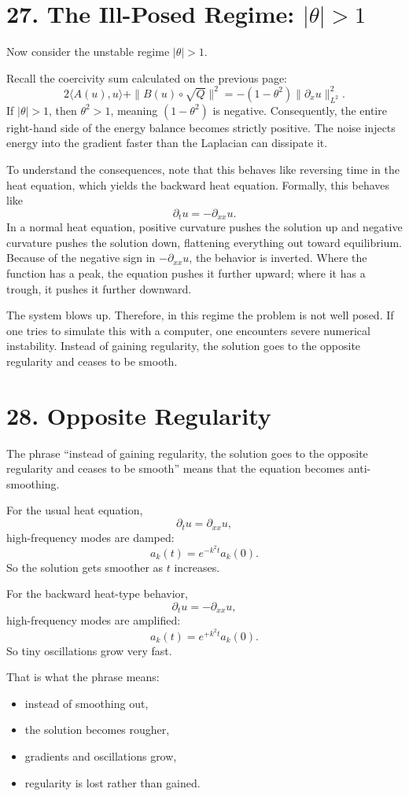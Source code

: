 \documentclass[11pt]{article}
\theoremstyle{definition}
\theoremstyle{remark}
\begin{document}
\section*{27. The Ill-Posed Regime: $|\theta|>1$}
Now consider the unstable regime $|\theta|>1$.

Recall the coercivity sum calculated on the previous page:
\[
2\langle A(u),u\rangle+\|B(u)\circ \sqrt{Q}\|^2=-(1-\theta^2)\|\partial_x u\|_{L^2}^2.
\]
If $|\theta|>1$, then $\theta^2>1$, meaning $(1-\theta^2)$ is negative. Consequently, the entire right-hand side of the energy balance becomes strictly positive. The noise injects energy into the gradient faster than the Laplacian can dissipate it.

To understand the consequences, note that this behaves like reversing time in the heat equation, which yields the backward heat equation. Formally, this behaves like
\[
\partial_t u=-\partial_{xx}u.
\]
In a normal heat equation, positive curvature pushes the solution up and negative curvature pushes the solution down, flattening everything out toward equilibrium. Because of the negative sign in $-\partial_{xx}u$, the behavior is inverted. Where the function has a peak, the equation pushes it further upward; where it has a trough, it pushes it further downward.

The system blows up. Therefore, in this regime the problem is not well posed. If one tries to simulate this with a computer, one encounters severe numerical instability. Instead of gaining regularity, the solution goes to the opposite regularity and ceases to be smooth.

\section*{28. Opposite Regularity}
The phrase ``instead of gaining regularity, the solution goes to the opposite regularity and ceases to be smooth'' means that the equation becomes anti-smoothing.

For the usual heat equation,
\[
\partial_t u=\partial_{xx}u,
\]
high-frequency modes are damped:
\[
a_k(t)=e^{-k^2 t}a_k(0).
\]
So the solution gets smoother as $t$ increases.

For the backward heat-type behavior,
\[
\partial_t u=-\partial_{xx}u,
\]
high-frequency modes are amplified:
\[
a_k(t)=e^{+k^2 t}a_k(0).
\]
So tiny oscillations grow very fast.

That is what the phrase means:
\begin{itemize}
\item instead of smoothing out,
\item the solution becomes rougher,
\item gradients and oscillations grow,
\item regularity is lost rather than gained.
\end{itemize}
\end{document}
